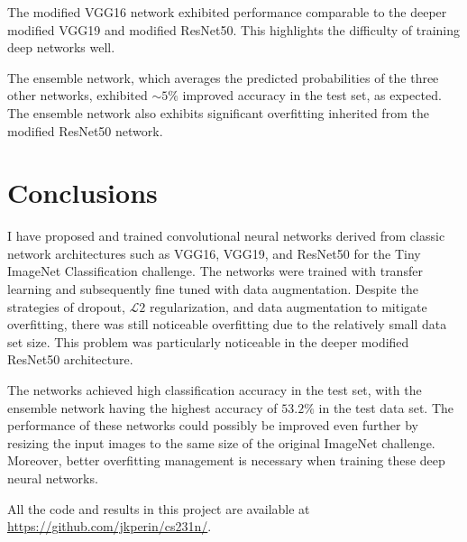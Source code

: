 \documentclass[10pt,twocolumn,letterpaper]{article}
\begin{document}
The modified VGG16 network exhibited performance comparable to the deeper modified VGG19 and modified ResNet50. This highlights the difficulty of training deep networks well. 

The ensemble network, which averages the predicted probabilities of the three other networks, exhibited $\sim5\%$ improved accuracy in the test set, as expected. The ensemble network also exhibits significant overfitting inherited from the modified ResNet50 network. 

\section{Conclusions} \label{sec:conclusion}

I have proposed and trained convolutional neural networks derived from classic network architectures such as VGG16, VGG19, and ResNet50 for the Tiny ImageNet Classification challenge. The networks were trained with transfer learning and subsequently fine tuned with data augmentation. Despite the strategies of dropout, $\mathcal{L}2$ regularization, and data augmentation to mitigate overfitting, there was still noticeable overfitting due to the relatively small data set size. This problem was particularly noticeable in the deeper modified ResNet50 architecture.

The networks achieved high classification accuracy in the test set, with the ensemble network having the highest accuracy of $53.2 \%$ in the test data set. The performance of these  networks could possibly be improved even further by resizing the input images to the same size of the original ImageNet challenge. Moreover, better overfitting management is necessary when training these deep neural networks.

All the code and results in this project are available at \url{https://github.com/jkperin/cs231n/}.

{\small


}
\end{document}
